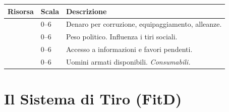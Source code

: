 \begin{center}
\begin{tabular}{L{2.8cm} C{1.5cm} p{9cm}}
  \toprule
  \textbf{Risorsa} & \textbf{Scala} & \textbf{Descrizione} \\
  \midrule
        & 0–6 & Denaro per corruzione, equipaggiamento, alleanze. \\
   & 0–6 & Peso politico. Influenza i tiri sociali. \\
     & 0–6 & Accesso a informazioni e favori pendenti. \\
       & 0–6 & Uomini armati disponibili. \textit{Consumabili.} \\
  \bottomrule
\end{tabular}
\end{center}

\section{Il Sistema di Tiro (FitD)}
\label{sec:tiro}


